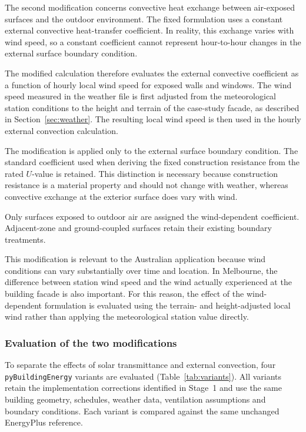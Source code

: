 \documentclass[12pt, a4paper]{article}
\begin{document}
The second modification concerns convective heat exchange between
air-exposed surfaces and the outdoor environment. The fixed formulation uses
a constant external convective heat-transfer coefficient. In reality, this
exchange varies with wind speed, so a constant coefficient cannot represent
hour-to-hour changes in the external surface boundary condition.

The modified calculation therefore evaluates the external convective
coefficient as a function of hourly local wind speed for exposed walls and
windows. The wind speed measured in the weather file is first adjusted from
the meteorological station conditions to the height and terrain of the
case-study facade, as described in Section~\ref{sec:weather}. The resulting
local wind speed is then used in the hourly external convection calculation.

The modification is applied only to the external surface boundary condition.
The standard coefficient used when deriving the fixed construction resistance
from the rated $U$-value is retained. This distinction is necessary because
construction resistance is a material property and should not change with
weather, whereas convective exchange at the exterior surface does vary with
wind.

Only surfaces exposed to outdoor air are assigned the wind-dependent
coefficient. Adjacent-zone and ground-coupled surfaces retain their existing
boundary treatments.

This modification is relevant to the Australian application because wind
conditions can vary substantially over time and location. In Melbourne, the
difference between station wind speed and the wind actually experienced at the
building facade is also important. For this reason, the effect of the
wind-dependent formulation is evaluated using the terrain- and height-adjusted
local wind rather than applying the meteorological station value directly.

\subsubsection{Evaluation of the two modifications}

To separate the effects of solar transmittance and external convection,
four \texttt{pyBuildingEnergy} variants are evaluated
(Table~\ref{tab:variants}). All variants retain the implementation corrections
identified in Stage~1 and use the same building geometry, schedules, weather
data, ventilation assumptions and boundary conditions. Each variant is compared
against the same unchanged EnergyPlus reference.
\end{document}
